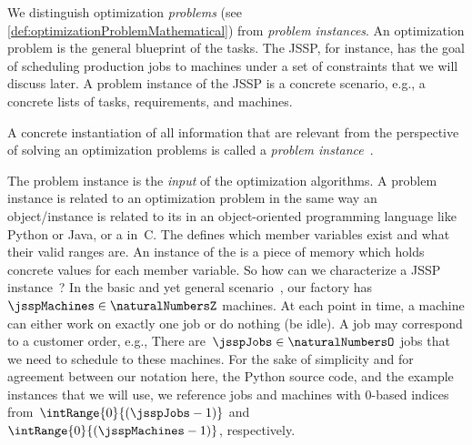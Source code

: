 %
\label{sec:problemInstance}%
%
%
%
We distinguish optimization \emph{problems} (see \autoref{def:optimizationProblemMathematical}) from \emph{problem instances}.
An optimization problem is the general blueprint of the tasks.
The \gls{JSSP}, for instance, has the goal of scheduling production jobs to machines under a set of constraints that we will discuss later.
A problem instance of the \gls{JSSP} is a concrete scenario, e.g., a concrete lists of tasks, requirements, and machines.%
%
\begin{definition}%
\label{def:instance}%
A concrete instantiation of all information that are relevant from the perspective of solving an optimization problems is called a \emph{problem instance}~\instance.%
\end{definition}%
%
The problem instance is the \emph{input} of the optimization algorithms.
A problem instance is related to an optimization problem in the same way an object/instance is related to its  in an object-oriented programming language like Python or Java, or a  in~C.
The  defines which member variables exist and what their valid ranges are.
An instance of the  is a piece of memory which holds concrete values for each member variable.%
%
\endhsection%
%
%
\label{sec:jsspInstance}%
%
%
\label{sec:jsspInstanceStructure}%
%
So how can we characterize a \gls{JSSP} instance~\instance?
In the basic and yet general scenario~\cite{GLLRK1979OAAIDSASAS,LLRKS1993SASAAC,L1982RRITTOMS,T1993BFBSP}, our factory has~$\jsspMachines\in\naturalNumbersZ$ machines.
At each point in time, a machine can either work on exactly one job or do nothing (be idle).
A job may correspond to a customer order, e.g., 
There are~$\jsspJobs\in\naturalNumbersO$ jobs that we need to schedule to these machines.
For the sake of simplicity and for agreement between our notation here, the Python source code, and the example instances that we will use, we reference jobs and machines with 0\nobreakdash-based indices from~$\intRange{0}{(\jsspJobs-1)}$ and~$\intRange{0}{(\jsspMachines-1)}$, respectively.

